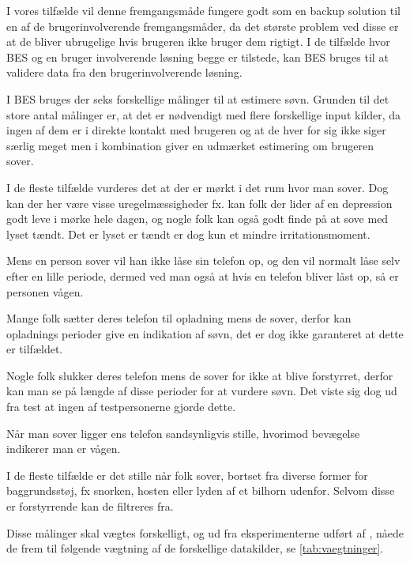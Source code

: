 I vores tilfælde vil denne fremgangsmåde fungere godt som en backup solution til en af de brugerinvolverende fremgangsmåder, da det største problem ved disse er at de bliver ubrugelige hvis brugeren ikke bruger dem rigtigt.
I de tilfælde hvor BES og en bruger involverende løsning begge er tilstede, kan BES bruges til at validere data fra den brugerinvolverende løsning. 

I BES bruges der seks forskellige målinger til at estimere søvn.
Grunden til det store antal målinger er, at det er nødvendigt med flere forskellige input kilder, da ingen af dem er i direkte kontakt med brugeren og at de hver for sig ikke siger særlig meget men i kombination giver en udmærket estimering om brugeren sover.
\begin{description}[style=nextline]
\item[Lys]
I de fleste tilfælde vurderes det at der er mørkt i det rum hvor man sover. Dog kan der her være visse uregelmæssigheder fx. kan folk der lider af en depression godt leve i mørke hele dagen, og nogle folk kan også godt finde på at sove med lyset tændt. Det er lyset er tændt er dog kun et mindre irritationsmoment.
\item[Lås]
Mens en person sover vil han ikke låse sin telefon op, og den vil normalt låse selv efter en lille periode, dermed ved man også at hvis en telefon bliver låst op, så er personen vågen.
\item[Opladning]
Mange folk sætter deres telefon til opladning mens de sover, derfor kan opladnings perioder give en indikation af søvn, det er dog ikke garanteret at dette er tilfældet.
\item[Slukket]
Nogle folk slukker deres telefon mens de sover for ikke at blive forstyrret, derfor kan man se på længde af disse perioder for at vurdere søvn. Det viste sig dog ud fra test at ingen af testpersonerne gjorde dette. 
\item[Bevægelse]
Når man sover ligger ens telefon sandsynligvis stille, hvorimod bevægelse indikerer man er vågen.
\item[Lyd]
I de fleste tilfælde er det stille når folk sover, bortset fra diverse former for baggrundsstøj, fx snorken, hosten eller lyden af et bilhorn udenfor. Selvom disse er forstyrrende kan de filtreres fra.
\end{description}
 
Disse målinger skal vægtes forskelligt, og ud fra eksperimenterne udført af \citet{6563918}, nåede de frem til følgende vægtning af de forskellige datakilder, se \cref{tab:vaegtninger}.

